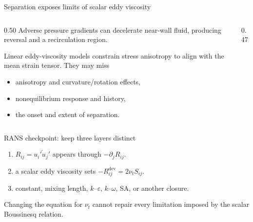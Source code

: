 \documentclass[aspectratio=169,11pt]{beamer}
\newcommand{\mean}[1]{\overline{#1}}
\begin{document}
\begin{frame}{Separation exposes limits of scalar eddy viscosity}
\begin{columns}[T,onlytextwidth]
\begin{column}{0.50\textwidth}
Adverse pressure gradients can decelerate near-wall fluid, producing reversal and a recirculation region.

Linear eddy-viscosity models constrain stress anisotropy to align with the mean strain tensor. They may miss
\begin{itemize}\itemsep3pt
  \item anisotropy and curvature/rotation effects,
  \item nonequilibrium response and history,
  \item the onset and extent of separation.
\end{itemize}

\end{column}
\begin{column}{0.47\textwidth}
\centering
{}
\end{column}
\end{columns}
\end{frame}

\begin{frame}{RANS checkpoint: keep three layers distinct}
\begin{enumerate}\itemsep8pt
  \item {}
  $R_{ij}=\mean{u_i'u_j'}$ appears through $-\partial_jR_{ij}$.
  \item {}
  a scalar eddy viscosity sets $-R_{ij}^{\mathrm{dev}}=2\nu_tS_{ij}$.
  \item {}
  constant, mixing length, $k$--$\varepsilon$, $k$--$\omega$, SA, or another closure.
\end{enumerate}

\begin{punchbox}
\centering
Changing the equation for $\nu_t$ cannot repair every limitation imposed by the scalar Boussinesq relation.
\end{punchbox}
\end{frame}
\end{document}
